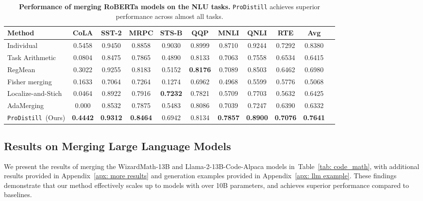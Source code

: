 \begin{table*}[t]
\centering
\setlength{\tabcolsep}{5pt}
\caption{\textbf{Performance of merging RoBERTa models on the NLU tasks.} \texttt{ProDistill} achieves superior performance across almost all tasks.}
\label{tab:roberta} 
\begin{tabular}{l|cccccccc|cc}
\toprule
\textbf{Method} & \textbf{CoLA} & \textbf{SST-2} & \textbf{MRPC} & \textbf{STS-B} & \textbf{QQP} & \textbf{MNLI} & \textbf{QNLI} & \textbf{RTE} & \textbf{Avg} \\

\midrule
Individual & 0.5458 & 0.9450 & 0.8858 & 0.9030 & 0.8999 & 0.8710 & 0.9244 & 0.7292 & 0.8380\\
Task Arithmetic  & 0.0804 & 0.8475 & 0.7865 & 0.4890 & 0.8133 & 0.7063 & 0.7558 & 0.6534 & 0.6415 \\
\midrule
RegMean & 0.3022 & 0.9255 & 0.8183 & 0.5152 & \textbf{0.8176} & 0.7089 & 0.8503 & 0.6462 & 0.6980 \\
Fisher merging& 0.1633 & 0.7064 & 0.7264 & 0.1274 & 0.6962 & 0.4968 & 0.5599 & 0.5776 & 0.5068 \\
Localize-and-Stich& 0.0464 & 0.8922 & 0.7916 & \textbf{0.7232} & 0.7821 & 0.5709 & 0.7703 & 0.5632 & 0.6425 \\
AdaMerging& 0.000 & 0.8532 & 0.7875 & 0.5483 & 0.8086 & 0.7039 & 0.7247 & 0.6390 & 0.6332 \\
\rowcolor{lightyellow}
\rowcolor{lightyellow}
\rowcolor{lightyellow}
\texttt{ProDistill}~(Ours)& \textbf{0.4442} & \textbf{0.9312} & \textbf{0.8464} & 0.6942 & 0.8134 & \textbf{0.7857} & \textbf{0.8900} & \textbf{0.7076} & \textbf{0.7641} \\
\bottomrule
\end{tabular}
\end{table*}


\subsection{Results on Merging Large Language Models}
We present the results of merging the WizardMath-13B and Llama-2-13B-Code-Alpaca models in~Table~\ref{tab: code_math}, with additional results provided in Appendix~\ref{apx: more results} and generation examples provided in Appendix~\ref{apx: llm example}. These findings demonstrate that our method effectively scales up to models with over 10B parameters, and achieves superior performance compared to baselines.

